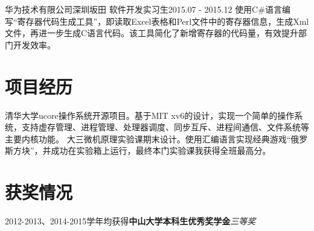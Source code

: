     \resumeSubheading
      {华为技术有限公司}{深圳坂田}
      {软件开发实习生}{2015.07 - 2015.12}
      \resumeItemListStart
          {使用C\#语言编写“寄存器代码生成工具”，即读取Excel表格和Perl文件中的寄存器信息，生成Xml文件，再进一步生成C语言代码。该工具简化了新增寄存器的代码量，有效提升部门开发效率。}
      \resumeItemListEnd

  \resumeSubHeadingListEnd

\section{项目经历}
  \resumeSubHeadingListStart
      {清华大学ucore操作系统开源项目。基于MIT xv6的设计，实现一个简单的操作系统，支持虚存管理、进程管理、处理器调度、同步互斥、进程间通信、文件系统等主要内核功能。}
      {大三微机原理实验课期末设计。使用汇编语言实现经典游戏“俄罗斯方块”，并成功在实验箱上运行，最终本门实验课我获得全班最高分。}
  \resumeSubHeadingListEnd

\section{获奖情况}
  \resumeSubHeadingListStart
  \small
    \item{2012-2013、2014-2015学年均获得\textbf{中山大学本科生优秀奖学金}\textit{三等奖}}
  \resumeSubHeadingListEnd

